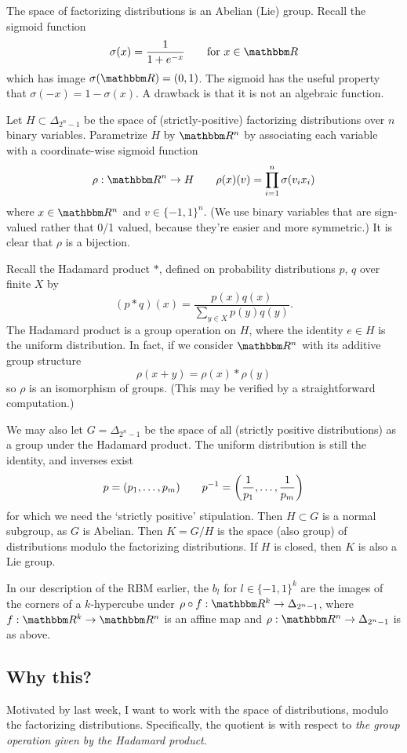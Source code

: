 \documentclass[12pt]{article}
\begin{document}
The space of factorizing distributions is an Abelian (Lie) group.  Recall the
sigmoid function
\[
    \sigma(x) = \frac{1}{1 + e^{-x}}
    \qquad\text{for $x \in \R$}
\]
which has image $\sigma(\R) = (0,1)$.  The sigmoid has the useful property that
$\sigma(-x) = 1 - \sigma(x)$.  A drawback is that it is not an algebraic
function.

Let $H \subset \Delta_{2^n-1}$ be the space of (strictly-positive) factorizing
distributions over $n$ binary variables.  Parametrize $H$ by $\R^n$ by
associating each variable with a coordinate-wise sigmoid function
\[
    \rho : \R^n \to H
    \qquad
    \rho(x)(v) = \prod_{i=1}^n \sigma(v_i x_i)
\]
where $x \in \R^n$ and $v \in \{-1,1\}^n$.  (We use binary variables that are
sign-valued rather that 0/1 valued, because they're easier and more symmetric.)
It is clear that $\rho$ is a bijection.

Recall the Hadamard product $*$, defined on probability distributions $p$, $q$
over finite $X$ by 
\[
    (p * q)(x) = \frac{p(x)q(x)}{\sum_{y \in X} p(y)q(y)}.
\]
The Hadamard product is a group operation on $H$, where the identity $e \in H$
is the uniform distribution.  In fact, if we consider $\R^n$ with its additive
group structure
\[
    \rho(x + y) = \rho(x) * \rho(y)
\]
so $\rho$ is an isomorphism of groups.  (This may be verified by a
straightforward computation.)

We may also let $G = \Delta_{2^n-1}$ be the space of all (strictly positive
distributions) as a group under the Hadamard product.  The uniform distribution
is still the identity, and inverses exist 
\[
    p = (p_1, \ldots, p_m)
    \qquad
    \inv p = \pdel*{\frac 1 {p_1}, \ldots, \frac 1 {p_m}}
\]
for which we need the `strictly positive' stipulation.  Then $H \subset G$ is a
normal subgroup, as $G$ is Abelian.  Then $K = G/H$ is the space (also group) of
distributions modulo the factorizing distributions.  If $H$ is closed, then $K$
is also a Lie group.

In our description of the RBM earlier, the $b_l$ for $l \in \{-1,1\}^k$ are the
images of the corners of a $k$-hypercube under $\rho \circ f: \R^k \to
\Delta_{2^n - 1}$, where $f: \R^k \to \R^n$ is an affine map and $\rho: \R^n \to
\Delta_{2^n - 1}$ is as above.

\subsection{Why this?}

Motivated by last week, I want to work with the space of distributions, modulo
the factorizing distributions.  Specifically, the quotient is with respect to
\textit{the group operation given by the Hadamard product}.
\end{document}
